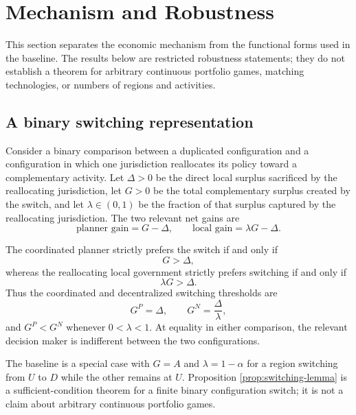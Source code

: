 \section{Mechanism and Robustness}
\label{sec:robustness}

This section separates the economic mechanism from the functional forms used in the baseline. The results below are restricted robustness statements; they do not establish a theorem for arbitrary continuous portfolio games, matching technologies, or numbers of regions and activities.

\subsection{A binary switching representation}

Consider a binary comparison between a duplicated configuration and a configuration in which one jurisdiction reallocates its policy toward a complementary activity. Let $\Delta>0$ be the direct local surplus sacrificed by the reallocating jurisdiction, let $G>0$ be the total complementary surplus created by the switch, and let $\lambda\in(0,1)$ be the fraction of that surplus captured by the reallocating jurisdiction. The two relevant net gains are
\[
\text{planner gain}=G-\Delta,
\qquad
\text{local gain}=\lambda G-\Delta.
\]

\begin{proposition}
\label{prop:switching-lemma}
The coordinated planner strictly prefers the switch if and only if
\begin{equation}
G>\Delta,
\label{eq:planner-G}
\end{equation}
whereas the reallocating local government strictly prefers switching if and only if
\begin{equation}
\lambda G>\Delta.
\label{eq:local-G}
\end{equation}
Thus the coordinated and decentralized switching thresholds are
\begin{equation}
G^P=\Delta,
\qquad
G^N=\frac{\Delta}{\lambda},
\label{eq:G-thresholds}
\end{equation}
and $G^P<G^N$ whenever $0<\lambda<1$. At equality in either comparison, the relevant decision maker is indifferent between the two configurations.
\end{proposition}

The baseline is a special case with $G=A$ and $\lambda=1-\alpha$ for a region switching from $U$ to $D$ while the other remains at $U$. Proposition \ref{prop:switching-lemma} is a sufficient-condition theorem for a finite binary configuration switch; it is not a claim about arbitrary continuous portfolio games.

